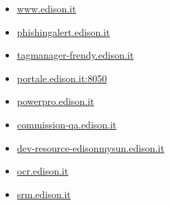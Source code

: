 \documentclass{article}
\begin{document}
\begin{itemize}
        
        
        \item \href{ https://www.edison.it/it?utm\\_source=sendinblue\\&utm\\_campaign=NL\\_luglio\\_SENDINBLUE\\&utm\\_medium=email }{ www.edison.it }
    
        
        
        \item \href{ https://phishingalert.edison.it/ }{ phishingalert.edison.it }
    
        
        
        \item \href{ http://tagmanager-frendy.edison.it/ }{ tagmanager-frendy.edison.it }
    
        
        
        \item \href{ https://portale.edison.it:8050/sap(bD1pdCZjPTIyMCZkPW1pbg==)/bc/bsp/sap/zpqf\\_bsp\\_app/initial\\_it.htm }{ portale.edison.it:8050 }
    
        
        
        \item \href{ https://powerpro.edison.it/fe/ }{ powerpro.edison.it }
    
        
        
        \item \href{ http://commission-qa.edison.it/ }{ commission-qa.edison.it }
    
        
        
        \item \href{ https://dev-resource-edisonmysun.edison.it/ }{ dev-resource-edisonmysun.edison.it }
    
        
        
        \item \href{ http://ocr.edison.it/ }{ ocr.edison.it }
    
        
        
        \item \href{ http://srm.edison.it/ }{ srm.edison.it }
    
        
        

\end{itemize}
\end{document}
